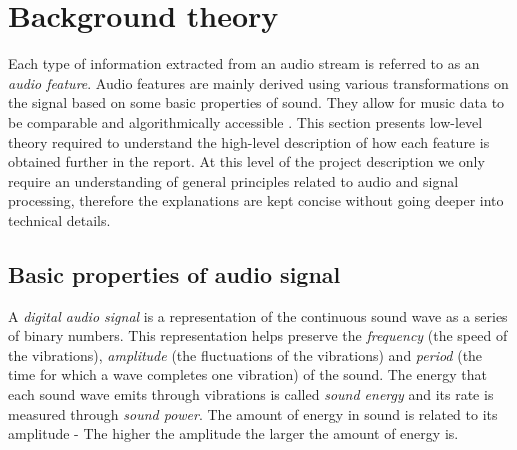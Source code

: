 
\chapter{Background theory}
\label{chap:relatedterms}
\ifpdf
    \graphicspath{{RelatedTerminology/Figures/PNG/}{RelatedTerminology/Figures/PDF/}{RelatedTerminology/Figures/}}
\else
    \graphicspath{{RelatedTerminology/Figures/EPS/}{RelatedTerminology/Figures/}}
\fi



%

Each type of information extracted from an audio stream is referred to as an
\textit{audio feature}. Audio features are mainly derived using various
transformations on the signal based on some basic properties of sound. They
allow for music data to be comparable and algorithmically accessible
\cite{mullershort}. This section presents low-level theory required to
understand the high-level description of how each feature is obtained further in
the report. At this level of the project description we only require an
understanding of general principles related to audio and signal processing,
therefore the explanations are kept concise without going deeper into technical
details.


\section{Basic properties of audio signal}
\label{sec:audioprops}
A \textit{digital audio signal} is a representation of the continuous sound wave
as a series of binary numbers. This representation helps preserve the
\textit{frequency} (the speed of the vibrations), \textit{amplitude} (the
fluctuations of the vibrations) and \textit{period} (the time for which a wave
completes one vibration) of the sound. The energy that each sound wave emits
through vibrations is called \textit{sound energy} and its rate is measured
through \textit{sound power}. The amount of energy in sound is related to its
amplitude - The higher the amplitude the larger the amount of energy is.

